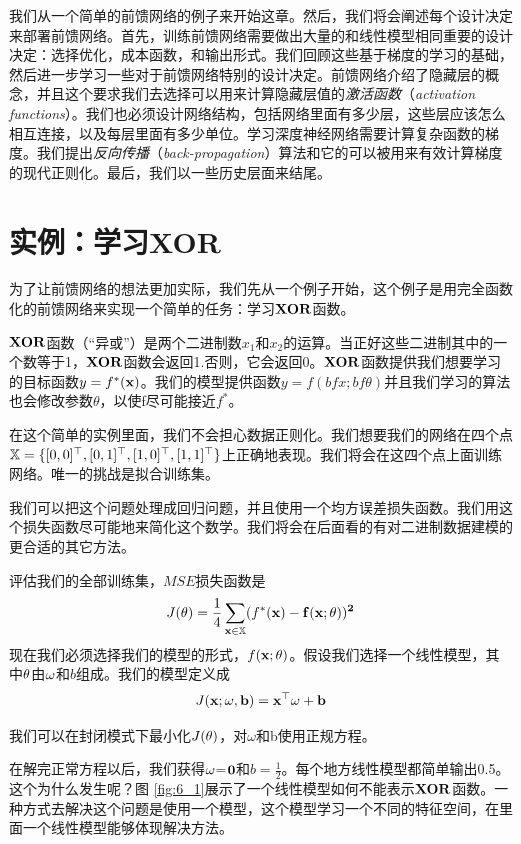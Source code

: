我们从一个简单的前馈网络的例子来开始这章。然后，我们将会阐述每个设计决定来部署前馈网络。首先，训练前馈网络需要做出大量的和线性模型相同重要的设计决定：选择优化，成本函数，和输出形式。我们回顾这些基于梯度的学习的基础，然后进一步学习一些对于前馈网络特别的设计决定。前馈网络介绍了隐藏层的概念，并且这个要求我们去选择可以用来计算隐藏层值的\emph{激活函数}（\emph{activation functions}）。我们也必须设计网络结构，包括网络里面有多少层，这些层应该怎么相互连接，以及每层里面有多少单位。学习深度神经网络需要计算复杂函数的梯度。我们提出\emph{反向传播}（\emph{back-propagation}）算法和它的可以被用来有效计算梯度的现代正则化。最后，我们以一些历史层面来结尾。

\section{实例：学习XOR}
\label{sec:6.1}

为了让前馈网络的想法更加实际，我们先从一个例子开始，这个例子是用完全函数化的前馈网络来实现一个简单的任务：学习$\bf{XOR}$函数。

$\bf{XOR}$函数（“异或”）是两个二进制数$x_1$和$x_2$的运算。当正好这些二进制其中的一个数等于1，$\bf{XOR}$函数会返回1.否则，它会返回0。$\bf{XOR}$函数提供我们想要学习的目标函数$y=f^*(\bf{x})$。我们的模型提供函数$y=f(bf{x};bf{\theta})$并且我们学习的算法也会修改参数$\theta$，以使f尽可能接近$f^*$。

在这个简单的实例里面，我们不会担心数据正则化。我们想要我们的网络在四个点$\mathbb{X}=\{[0,0]^\top,[0,1]^\top,[1,0]^\top,[1,1]^\top\}$上正确地表现。我们将会在这四个点上面训练网络。唯一的挑战是拟合训练集。

我们可以把这个问题处理成回归问题，并且使用一个均方误差损失函数。我们用这个损失函数尽可能地来简化这个数学。我们将会在后面看的有对二进制数据建模的更合适的其它方法。

评估我们的全部训练集，$MSE$损失函数是
\begin{equation}
J(\theta)=\frac{1}{4} \sum_{\bf{x}\in \mathbb{X}} (f^*(\bf{x})-f(\bf{x};\bf{\theta}))^2
\end{equation}
现在我们必须选择我们的模型的形式，$f(\bf{x};\bf{\theta})$。假设我们选择一个线性模型，其中$\bf{\theta}$由$\bf{\omega}$和$b$组成。我们的模型定义成
\begin{equation}
J(\bf{x};\bf{\omega},b)=\bf{x}^\top \bf{\omega} + b 
\end{equation}

我们可以在封闭模式下最小化$J(\bf{\theta})$，对$\omega$和b使用正规方程。

在解完正常方程以后，我们获得$\bf{\omega}$=$\bf{0}$和$b=\frac{1}{2}$。每个地方线性模型都简单输出0.5。这个为什么发生呢？图 \ref{fig:6_1}展示了一个线性模型如何不能表示$\bf{XOR}$函数。一种方式去解决这个问题是使用一个模型，这个模型学习一个不同的特征空间，在里面一个线性模型能够体现解决方法。

